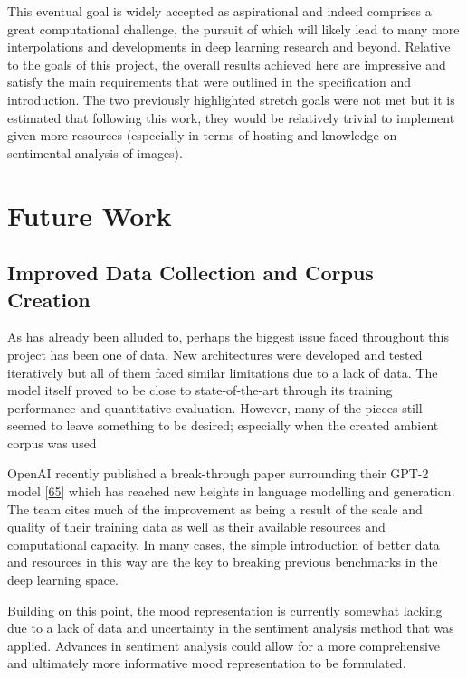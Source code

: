 \documentclass[12pt,]{article}
\begin{document}
This eventual goal is widely accepted as aspirational and indeed
comprises a great computational challenge, the pursuit of which will
likely lead to many more interpolations and developments in deep
learning research and beyond. Relative to the goals of this project, the
overall results achieved here are impressive and satisfy the main
requirements that were outlined in the specification and introduction.
The two previously highlighted stretch goals were not met but it is
estimated that following this work, they would be relatively trivial to
implement given more resources (especially in terms of hosting and
knowledge on sentimental analysis of images).

\hypertarget{future-work}{%
\section{Future Work}\label{future-work}}

\hypertarget{improved-data-collection-and-corpus-creation}{%
\subsection{Improved Data Collection and Corpus
Creation}\label{improved-data-collection-and-corpus-creation}}

As has already been alluded to, perhaps the biggest issue faced
throughout this project has been one of data. New architectures were
developed and tested iteratively but all of them faced similar
limitations due to a lack of data. The model itself proved to be close
to state-of-the-art through its training performance and quantitative
evaluation. However, many of the pieces still seemed to leave something
to be desired; especially when the created ambient corpus was used

OpenAI recently published a break-through paper surrounding their GPT-2
model {[}\protect\hyperlink{ref-radford2018language}{65}{]} which has
reached new heights in language modelling and generation. The team cites
much of the improvement as being a result of the scale and quality of
their training data as well as their available resources and
computational capacity. In many cases, the simple introduction of better
data and resources in this way are the key to breaking previous
benchmarks in the deep learning space.

Building on this point, the mood representation is currently somewhat
lacking due to a lack of data and uncertainty in the sentiment analysis
method that was applied. Advances in sentiment analysis could allow for
a more comprehensive and ultimately more informative mood representation
to be formulated.
\end{document}
